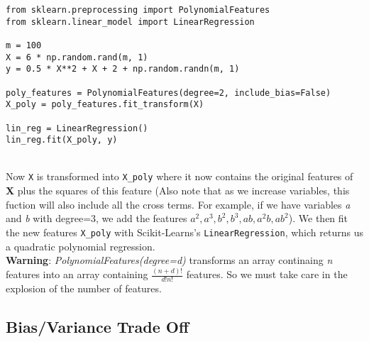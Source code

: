 \begin{verbatim}
from sklearn.preprocessing import PolynomialFeatures
from sklearn.linear_model import LinearRegression

m = 100
X = 6 * np.random.rand(m, 1)
y = 0.5 * X**2 + X + 2 + np.random.randn(m, 1)

poly_features = PolynomialFeatures(degree=2, include_bias=False)
X_poly = poly_features.fit_transform(X)

lin_reg = LinearRegression()
lin_reg.fit(X_poly, y)
\end{verbatim} 

\noindent
\\ Now \texttt{X} is transformed into \texttt{X_poly} where it now contains the original features of \textbf{X}
plus the squares of this feature (Also note that as we increase variables, this fuction will also include all
the cross terms. For example, if we have variables \textit{a} and \textit{b} with degree=3, we add the features
$a^{2}, a^{3}, b^{2}, b^{3}, ab, a^{2}b, ab^{2}$). We then fit the new features \texttt{X_poly} 
with Scikit-Learns's \texttt{LinearRegression}, which returns us a quadratic polynomial regression. \\

\noindent
\textbf{Warning}: \textit{PolynomialFeatures(degree=d)} transforms an array continaing \textit{n} features into
an array containing $\frac{(n+d)!}{d!n!}$ features. So we must take care in the explosion of the number of 
features.

\subsection*{Bias/Variance Trade Off}

